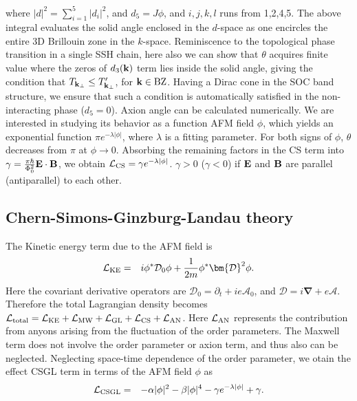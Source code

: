 \documentclass[aps,floatfix,prl]{revtex4}
\begin{document}
where $|d|^2=\sum_{i=1}^5|d_i|^2$, and $d_5=J\phi$, and $i,j,k,l$ runs from 1,2,4,5. The above integral evaluates the solid angle enclosed in the $d$-space as one encircles the entire 3D Brillouin zone in the $k$-space. Reminiscence to the topological phase transition in a single SSH chain, here also we can show that $\theta$ acquires finite value where the zeros of $d_3({\bf k})$ term lies inside the solid angle, giving the condition that $T_{{\bf k}_{\perp}}\le T'_{{\bf k}_{\perp}}$, for ${\bf k}\in {\rm BZ}$. Having a Dirac cone in the SOC band structure, we ensure that such a condition is automatically satisfied in the non-interacting phase ($d_5=0$). Axion angle can be calculated numerically. We are interested in studying its behavior as a function AFM field $\phi$, which yields an exponential function $\pi e^{-\lambda|\phi|}$, where $\lambda$ is a fitting parameter. For both signs of $\phi$, $\theta$ decreases from $\pi$ at $\phi\rightarrow0$. Absorbing the remaining factors in the CS term into  $\gamma=\frac{\pi\hbar}{\Phi_0^2}{\bf E}\cdot{\bf B}$, we obtain $\mathcal{L}_{\rm CS}=\gamma e^{-\lambda|\phi|}$. $\gamma>0$ ($\gamma<0$) if ${\bf E}$ and ${\bf B}$ are parallel (antiparallel) to each other.    

\subsection{Chern-Simons-Ginzburg-Landau theory} 
The Kinetic energy term due to the AFM field is 
\begin{eqnarray}
\mathcal{L}_{\rm KE} &=& i\phi^*\mathcal{D}_0\phi + \frac{1}{2m}\phi^*\bm{\mathcal{D}}^2\phi.
\label{Eq:KE}
\end{eqnarray}
Here the covariant derivative operators are $\mathcal{D}_0=\partial_t +ie\mathcal{A}_0$, and $\bm{\mathcal{D}}=i{\bm \nabla}+e\bm{\mathcal{A}}$. Therefore the total Lagrangian density becomes\cite{CSGL_rest,CSGL_Zhang} $\mathcal{L}_{\rm total}=\mathcal{L}_{\rm KE} + \mathcal{L}_{\rm MW} + \mathcal{L}_{\rm GL} + \mathcal{L}_{\rm CS}+ \mathcal{L}_{\rm AN}$. Here $\mathcal{L}_{\rm AN}$ represents the contribution from anyons arising from the fluctuation of the order parameters. The Maxwell term does not involve the order parameter or axion term, and thus also can be neglected. Neglecting space-time dependence of the order parameter, we otain the effect CSGL term in terms of the AFM field $\phi$ as
{
\begin{eqnarray}
\mathcal{L}_{\rm CSGL}&=&-\alpha|\phi|^2 - \beta|\phi|^4 - \gamma e^{-\lambda|\phi|}+\gamma.
\label{CSGL}
\end{eqnarray}
}
\end{document}
